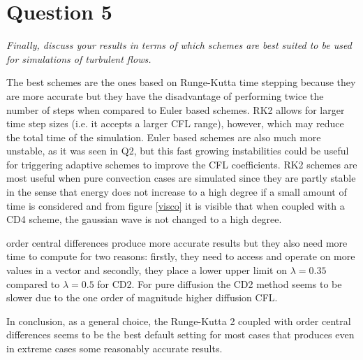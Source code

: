 \section*{Question 5}
\emph{Finally, discuss your results in terms of which schemes are best suited to be used for simulations of turbulent flows.}

The best schemes are the ones based on Runge-Kutta time stepping because they are more accurate but they have the disadvantage of performing twice the number of steps when compared to Euler based schemes. RK2 allows for larger time step sizes (i.e. it accepts a larger CFL range), however, which may reduce the total time of the simulation. Euler based schemes are also much more unstable, as it was seen in Q2, but this fast growing instabilities could be useful for triggering adaptive schemes to improve the CFL coefficients. RK2 schemes are most useful when pure convection cases are simulated since they are partly stable in the sense that energy does not increase to a high degree if a small amount of time is considered and from figure \ref{visco} it is visible that when coupled with a CD4 scheme, the gaussian wave is not changed to a high degree.

 order central differences produce more accurate results but they also need more time to compute for two reasons: firstly, they need to access and operate on more values in a vector and secondly, they place a lower upper limit on $\lambda = 0.35$ compared to $\lambda = 0.5$ for CD2. For pure diffusion the CD2 method seems to be slower due to the one order of magnitude higher diffusion CFL.

In conclusion, as a general choice, the Runge-Kutta 2 coupled with  order central differences seems to be the best default setting for most cases that produces even in extreme cases some reasonably accurate results.